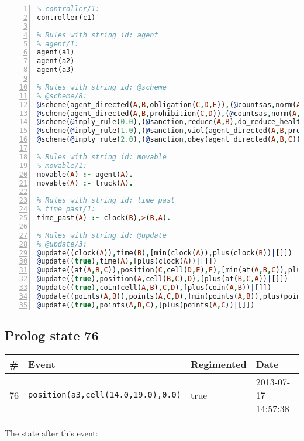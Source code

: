 \documentclass[11pt]{article}\usepackage[utf8]{inputenc}\usepackage{geometry}
\begin{document}
\begin{lstlisting}[language=Prolog, numbers=left]
% Rules with string id: controller
% controller/1:
controller(c1)

% Rules with string id: agent
% agent/1:
agent(a1)
agent(a2)
agent(a3)

% Rules with string id: @scheme
% @scheme/8:
@scheme(agent_directed(A,B,obligation(C,D,E)),(@countsas,norm(A,B,F,obligation(C,D,E)),F),false,(listTrue(C)),(time_past(D)),false,[plus(viol(agent_directed(A,B,obligation(C,D,E))))|[]],[plus(obey(agent_directed(A,B,obligation(C,D,E))))|[]])
@scheme(agent_directed(A,B,prohibition(C,D)),(@countsas,norm(A,B,E,prohibition(C,D)),E),(listTrue(C)),false,(false),false,[plus(viol(agent_directed(A,B,prohibition(C,D))))|[]],[plus(obey(agent_directed(A,B,prohibition(C,D))))|[]])
@scheme(@imply_rule(0.0),(@sanction,reduce(A,B),do_reduce_health(A,B),notifyAgent(A,changed(status))),true,false,false,false,[min(reduce(A,B))|[]],[])
@scheme(@imply_rule(1.0),(@sanction,viol(agent_directed(A,B,prohibition(C,D))),do_sanction(D)),true,false,false,false,[min(viol(agent_directed(A,B,prohibition(C,D))))|[]],[])
@scheme(@imply_rule(2.0),(@sanction,obey(agent_directed(A,B,C))),true,false,false,false,[min(obey(agent_directed(A,B,C)))|[]],[])

% Rules with string id: movable
% movable/1:
movable(A) :- agent(A).
movable(A) :- truck(A).

% Rules with string id: time_past
% time_past/1:
time_past(A) :- clock(B),>(B,A).

% Rules with string id: @update
% @update/3:
@update((clock(A)),time(B),[min(clock(A)),plus(clock(B))|[]])
@update((true),time(A),[plus(clock(A))|[]])
@update((at(A,B,C)),position(C,cell(D,E),F),[min(at(A,B,C)),plus(at(D,E,C))|[]])
@update((true),position(A,cell(B,C),D),[plus(at(B,C,A))|[]])
@update((true),coin(cell(A,B),C,D),[plus(coin(A,B))|[]])
@update((points(A,B)),points(A,C,D),[min(points(A,B)),plus(points(A,D))|[]])
@update((true),points(A,B,C),[plus(points(A,C))|[]])

\end{lstlisting}
\clearpage 
\subsection{Prolog state 76}
\begin{table}[ht]
\centering 
\begin{tabular}{l l l l} 
\textbf{\#} & \textbf{Event} & \textbf{Regimented} & \textbf{Date} \\ [0.5ex] 
\hline
76&\texttt{position(a3,cell(14.0,19.0),0.0)}&true&2013-07-17 14:57:38\\ [1ex] \hline\end{tabular}
\end{table}
The state after this event:
\end{document}
